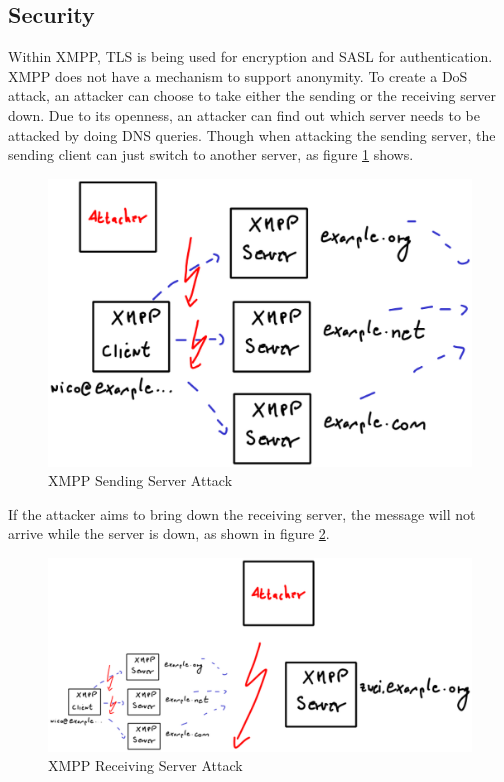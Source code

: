 \subsection{Security}
Within XMPP, TLS is being used for encryption and SASL for authentication.
XMPP does not have a mechanism to support anonymity.
To create a DoS attack, an attacker can choose to take either the sending
or the receiving server down. Due to its openness, an attacker can find out
which server needs to be attacked by doing DNS queries. Though when attacking
the sending server, the sending client can just switch to another server,
as figure \ref{jabbersendingserverattack} shows.
\begin{figure}
    \centering
    \caption{XMPP Sending Server Attack}
    \label{jabbersendingserverattack}
    \includegraphics[scale=0.7]{jabbersendingserverattack.eps}
\end{figure}
If the attacker aims to bring down the receiving server, the message
will not arrive while the server is down, as shown in figure 
\ref{jabberreceivingserverattack}.
\begin{figure}
    \centering
    \caption{XMPP Receiving Server Attack}
    \label{jabberreceivingserverattack}
    \includegraphics[scale=0.7]{jabberreceivingserverattack.eps}
\end{figure}
